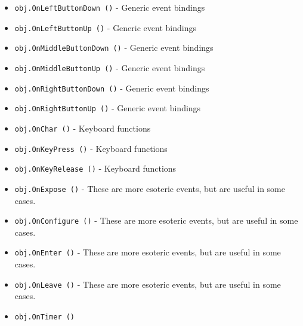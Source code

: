 \begin{itemize}
\item  \verb|obj.OnLeftButtonDown ()| -  Generic event bindings

\item  \verb|obj.OnLeftButtonUp ()| -  Generic event bindings

\item  \verb|obj.OnMiddleButtonDown ()| -  Generic event bindings

\item  \verb|obj.OnMiddleButtonUp ()| -  Generic event bindings

\item  \verb|obj.OnRightButtonDown ()| -  Generic event bindings

\item  \verb|obj.OnRightButtonUp ()| -  Generic event bindings

\item  \verb|obj.OnChar ()| -  Keyboard functions

\item  \verb|obj.OnKeyPress ()| -  Keyboard functions

\item  \verb|obj.OnKeyRelease ()| -  Keyboard functions

\item  \verb|obj.OnExpose ()| -  These are more esoteric events, but are useful in some cases.

\item  \verb|obj.OnConfigure ()| -  These are more esoteric events, but are useful in some cases.

\item  \verb|obj.OnEnter ()| -  These are more esoteric events, but are useful in some cases.

\item  \verb|obj.OnLeave ()| -  These are more esoteric events, but are useful in some cases.

\item  \verb|obj.OnTimer ()|

\end{itemize}
